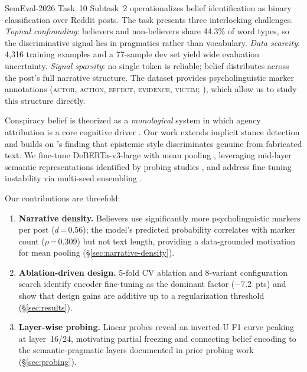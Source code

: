 \documentclass[11pt]{article}
\begin{document}
SemEval-2026 Task~10 Subtask~2 \citep[PsyCoMark;][]{samory-etal-2026-semeval} operationalizes belief identification as binary classification over Reddit posts.
The task presents three interlocking challenges.
\emph{Topical confounding}: believers and non-believers share 44.3\% of word types, so the discriminative signal lies in pragmatics rather than vocabulary.
\emph{Data scarcity}: 4,316 training examples and a 77-sample dev set yield wide evaluation uncertainty.
\emph{Signal sparsity}: no single token is reliable; belief distributes across the post's full narrative structure.
The dataset provides psycholinguistic marker annotations (\textsc{actor}, \textsc{action}, \textsc{effect}, \textsc{evidence}, \textsc{victim}; \citealt{samory2018conspiracy}), which allow us to study this structure directly.

Conspiracy belief is theorized as a \emph{monological} system \citep{goertzel1994belief} in which agency attribution is a core cognitive driver \citep{douglas2019understanding}.
Our work extends implicit stance detection \citep{mohammad2016semeval,aldayel2021stance} and builds on \citet{rashkin2017truth}'s finding that epistemic style discriminates genuine from fabricated text.
We fine-tune DeBERTa-v3-large \citep{he2021debertav3} with mean pooling \citep{reimers2019sentencebert}, leveraging mid-layer semantic representations identified by probing studies \citep{tenney2019bert,jawahar2019bert}, and address fine-tuning instability \citep{dodge2020finetuning} via multi-seed ensembling \citep{mosbach2021stability}.

Our contributions are threefold:

\begin{enumerate}[leftmargin=*,nosep,itemsep=1pt]
\item \textbf{Narrative density.}
Believers use significantly more psycholinguistic markers per post ($d$\,=\,0.56); the model's predicted probability correlates with marker count ($\rho$\,=\,0.309) but not text length, providing a data-grounded motivation for mean pooling (\S\ref{sec:narrative-density}).
\item \textbf{Ablation-driven design.}
5-fold CV ablation and 8-variant configuration search identify encoder fine-tuning as the dominant factor ($-$7.2~pts) and show that design gains are additive up to a regularization threshold (\S\ref{sec:results}).
\item \textbf{Layer-wise probing.}
Linear probes reveal an inverted-U F1 curve peaking at layer~16/24, motivating partial freezing and connecting belief encoding to the semantic-pragmatic layers documented in prior probing work (\S\ref{sec:probing}).
\end{enumerate}
\end{document}
